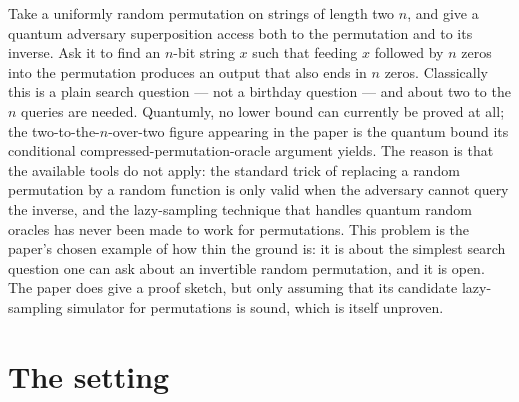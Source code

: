 \documentclass{conjura-conjecture}
\begin{document}

\vspace{0.4em}

\begin{informalconjecture}
Take a uniformly random permutation on strings of length two $n$, and
give a quantum adversary superposition access both to the permutation
and to its inverse. Ask it to find an $n$-bit string $x$ such that
feeding $x$ followed by $n$ zeros into the permutation produces an
output that also ends in $n$ zeros. Classically this is a plain search
question --- not a birthday question --- and about two to the $n$
queries are needed. Quantumly, no lower bound can currently be proved
at all; the two-to-the-$n$-over-two figure appearing in the paper is
the quantum bound its conditional compressed-permutation-oracle
argument yields. The reason is that the available tools do not apply:
the standard trick of replacing a random permutation by a random
function is only valid when the adversary cannot query the inverse,
and the lazy-sampling technique that handles quantum random oracles
has never been made to work for permutations. This problem is the
paper's chosen example of how thin the ground is: it is about the
simplest search question one can ask about an invertible random
permutation, and it is open. The paper does give a proof sketch, but
only assuming that its candidate lazy-sampling simulator for
permutations is sound, which is itself unproven.
\end{informalconjecture}

\section{The setting}\label{sec:setting}
\end{document}
